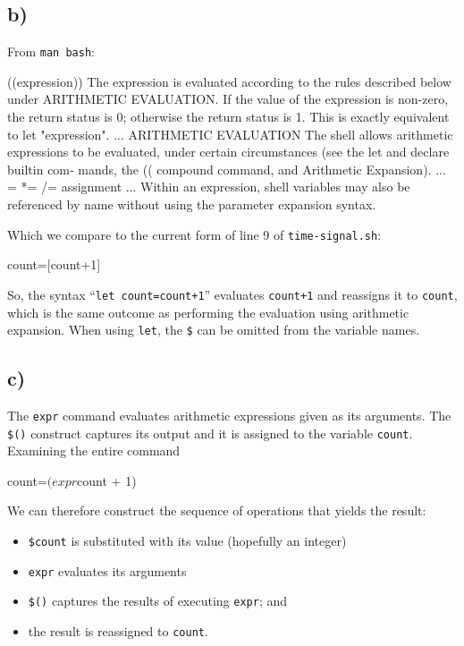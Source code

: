 \documentclass{article}
\begin{document}
\subsection{b)}

From \texttt{man bash}:

\begin{bashinline}
((expression))
      The expression is evaluated according to the rules described below under ARITHMETIC EVALUATION.  If the value of the expression is non-zero, the return status is 0; otherwise the return  status is 1.  This is exactly equivalent to let "expression".
...
ARITHMETIC EVALUATION
       The shell allows arithmetic expressions to be evaluated,  under
       certain  circumstances  (see  the  let and declare builtin com‐
       mands, the ((  compound  command,  and  Arithmetic  Expansion).
...
       = *= /= %
              assignment
...
        Within an expression, shell variables may also be referenced by name
        without using  the parameter  expansion  syntax.
\end{bashinline}

Which we compare to the current form of line 9 of \texttt{time-signal.sh}:

\begin{bashcode}
count=$[$count+1]
\end{bashcode}

So, the syntax ``\texttt{let count=count+1}'' evaluates \texttt{count+1} and reassigns it to \texttt{count}, which is the same outcome as performing the evaluation using arithmetic expansion. When using \texttt{let}, the \texttt{\$} can be omitted from the variable names.

\subsection{c)}

The \texttt{expr} command evaluates arithmetic expressions given as its arguments. The \texttt{\$()} construct captures its output and it is assigned to the variable \texttt{count}. Examining the entire command

\begin{bashcode}
count=$(expr $count + 1)
\end{bashcode}

We can therefore construct the sequence of operations that yields the result:
\begin{itemize}
\item \texttt{\$count} is substituted with its value (hopefully an integer)
\item \texttt{expr} evaluates its arguments
\item \texttt{\$()} captures the results of executing \texttt{expr}; and
\item the result is reassigned to \texttt{count}.
\end{itemize}
\end{document}

